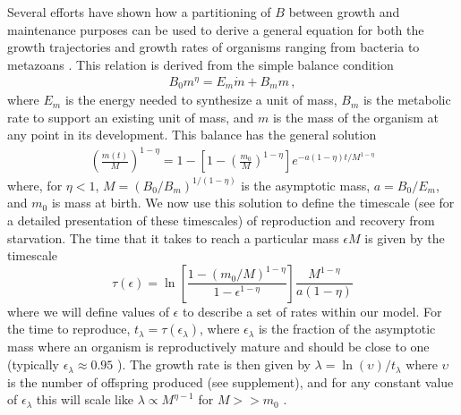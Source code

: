 \documentclass{pnastwo}
\begin{document}
\begin{article}
Several efforts have shown how a partitioning of $B$ between growth and
maintenance purposes can be used to derive a general equation for both the
growth trajectories and growth rates of organisms ranging from bacteria to
metazoans
\cite{West:2001bv,moses2008rmo,gillooly2002esa,hou,Kempes:2012hy}. This relation is derived from the simple balance condition \cite{West:2001bv,moses2008rmo,gillooly2002esa,hou,Kempes:2012hy}
\begin{eqnarray}
\label{balance}
B_{0}m^{\eta}=E_{m}\dot{m}+B_{m}m\,,
\end{eqnarray}
where $E_{m}$ is the energy needed to synthesize a unit of mass, $B_{m}$ is
the metabolic rate to support an existing unit of mass, and $m$ is the mass
of the organism at any point in its development.  This balance has the
general solution \cite{bettencourt,Kempes:2012hy}
\begin{eqnarray}
\label{m1}
\left(\frac{m\left(t\right)}{M}\right)^{1-\eta}\!=1\!-\!\left[1\!-\!\left(\frac{m_{0}}{M}\right)^{1\!-\!\eta}\right]e^{-a\left(1\!-\!\eta\right)t/M^{1-\eta}}
\end{eqnarray}
where, for $\eta<1$, $M=(B_{0}/B_{m})^{1/(1-\eta)}$ is the asymptotic mass, $a=B_{0}/E_{m}$, and $m_0$ is mass at birth.  We now use this solution to define the timescale (see \cite{moses2008rmo} for a detailed presentation of these timescales) of reproduction and recovery from starvation. The time that it takes to reach a particular mass $\epsilon M$ is given by the timescale 
\begin{equation}
\label{t1}
\tau\left(\epsilon\right) = \ln\left[\frac{1-\left(m_{0}/M\right)^{1-\eta}}{1-\epsilon^{1-\eta}}\right]\frac{M^{1-\eta}}{a\left(1-\eta\right)}
\end{equation}
where we will define values of $\epsilon$ to describe a set of rates within our model. For the time to reproduce, $t_{\lambda}=\tau\left(\epsilon_{\lambda}\right)$, where $\epsilon_{\lambda}$ is the fraction of the asymptotic mass where an organism is reproductively mature and should be close to one (typically $\epsilon_{\lambda}\approx0.95$ \cite{West:2001bv}). The growth rate is then given by $\lambda=\ln\left(\upsilon\right)/t_{\lambda}$ where $\upsilon$ is the number of offspring produced (see supplement), and for any constant value of $\epsilon_{\lambda}$ this will scale like $\lambda\propto M^{\eta-1}$ for $M>>m_{0}$ \cite{West:2001bv,moses2008rmo,gillooly2002esa,hou,Kempes:2012hy}.



\end{article}
\end{document}
